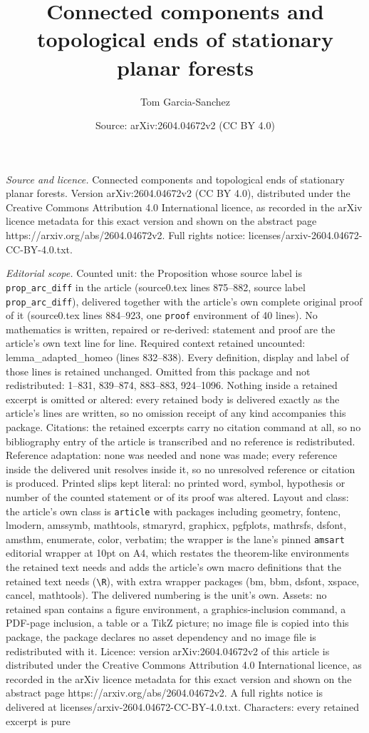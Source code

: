 \documentclass[10pt,a4paper]{amsart}
\title[Connected components and topological ends of stationary plan]{Connected components and topological ends of stationary planar forests}
\author{Tom Garcia-Sanchez}
\date{Source: arXiv:2604.04672v2 (CC BY 4.0)}
\begin{document}
\maketitle

\noindent\emph{Source and licence.} Connected components and topological ends of stationary planar forests. Version arXiv:2604.04672v2 (CC BY 4.0), distributed under the Creative Commons Attribution 4.0 International licence, as recorded in the arXiv licence metadata for this exact version and shown on the abstract page https://arxiv.org/abs/2604.04672v2. Full rights notice: licenses/arxiv-2604.04672-CC-BY-4.0.txt.\par\smallskip

\noindent\textit{Editorial scope.} Counted unit: the Proposition whose source label is \texttt{prop\_arc\_diff} in the article (source0.tex lines 875--882, source label \texttt{prop\_arc\_diff}), delivered together with the article's own complete original proof of it (source0.tex lines 884--923, one \texttt{proof} environment of 40 lines). No mathematics is written, repaired or re-derived: statement and proof are the article's own text line for line. Required context retained uncounted: lemma\_adapted\_homeo (lines 832--838). Every definition, display and label of those lines is retained unchanged. Omitted from this package and not redistributed: 1--831, 839--874, 883--883, 924--1096. Nothing inside a retained excerpt is omitted or altered: every retained body is delivered exactly as the article's lines are written, so no omission receipt of any kind accompanies this package. Citations: the retained excerpts carry no citation command at all, so no bibliography entry of the article is transcribed and no reference is redistributed. Reference adaptation: none was needed and none was made; every reference inside the delivered unit resolves inside it, so no unresolved reference or citation is produced. Printed slips kept literal: no printed word, symbol, hypothesis or number of the counted statement or of its proof was altered. Layout and class: the article's own class is \texttt{article} with packages including geometry, fontenc, lmodern, amssymb, mathtools, stmaryrd, graphicx, pgfplots, mathrsfs, dsfont, amsthm, enumerate, color, verbatim; the wrapper is the lane's pinned \texttt{amsart} editorial wrapper at 10pt on A4, which restates the theorem-like environments the retained text needs and adds the article's own macro definitions that the retained text needs (\texttt{\textbackslash R}), with extra wrapper packages (bm, bbm, dsfont, xspace, cancel, mathtools). The delivered numbering is the unit's own. Assets: no retained span contains a figure environment, a graphics-inclusion command, a PDF-page inclusion, a table or a TikZ picture; no image file is copied into this package, the package declares no asset dependency and no image file is redistributed with it. Licence: version arXiv:2604.04672v2 of this article is distributed under the Creative Commons Attribution 4.0 International licence, as recorded in the arXiv licence metadata for this exact version and shown on the abstract page https://arxiv.org/abs/2604.04672v2. A full rights notice is delivered at licenses/arxiv-2604.04672-CC-BY-4.0.txt. Characters: every retained excerpt is pure 
\end{document}
